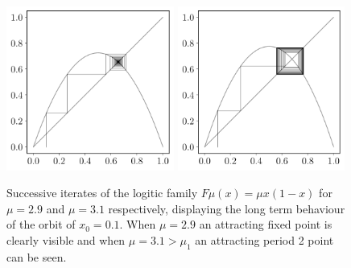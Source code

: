 \documentclass[11pt,a4paper,oneside]{memoir}
\theoremstyle{plain}
\theoremstyle{definition}
\begin{document}
\begin{figure}[h]
    \centering
    \includegraphics[width=5.5cm]{cobweb_0.1_2.9.pdf}
    \includegraphics[width=5.5cm]{cobweb_0.1_3.1.pdf}
    \caption{Successive iterates of the logitic family $F{\mu}(x) = \mu x(1-x)$ for $\mu = 2.9$ and $\mu = 3.1$ respectively, displaying the long term behaviour of the orbit of $x_0 = 0.1$. When $\mu = 2.9$ an attracting fixed point is clearly visible and when $\mu = 3.1 > \mu_1$ an attracting period 2 point can be seen.}
    \label{fig:cobweb_2.9_3.1}
\end{figure}
\end{document}
